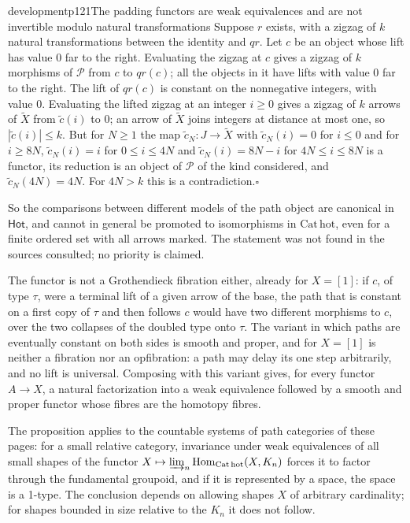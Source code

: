 \begin{dcomment}{development}{p121}{The padding functors are weak equivalences and are not invertible modulo natural transformations}
Suppose $r$ exists, with a zigzag of $k$ natural transformations between the identity and $qr$. Let $c$ be an object whose lift has value $0$ far to the right. Evaluating the zigzag at $c$ gives a zigzag of $k$ morphisms of $\mathcal P$ from $c$ to $qr(c)$; all the objects in it have lifts with value $0$ far to the right. The lift of $qr(c)$ is constant on the nonnegative integers, with value $0$. Evaluating the lifted zigzag at an integer $i\geq0$ gives a zigzag of $k$ arrows of $\widetilde X$ from $\widetilde c(i)$ to $0$; an arrow of $\widetilde X$ joins integers at distance at most one, so $|\widetilde c(i)|\leq k$. But for $N\geq1$ the map $\widetilde c_N:J\to\widetilde X$ with $\widetilde c_N(i)=0$ for $i\leq0$ and for $i\geq8N$, $\widetilde c_N(i)=i$ for $0\leq i\leq4N$ and $\widetilde c_N(i)=8N-i$ for $4N\leq i\leq8N$ is a functor, its reduction is an object of $\mathcal P$ of the kind considered, and $\widetilde c_N(4N)=4N$. For $4N>k$ this is a contradiction.\hfill$\square$

So the comparisons between different models of the path object are canonical in $\mathsf{Hot}$, and cannot in general be promoted to isomorphisms in $\mathrm{Cat}\,\mathrm{hot}$, even for a finite ordered set with all arrows marked. The statement was not found in the sources consulted; no priority is claimed.
\end{dcomment}

The functor is not a Grothendieck fibration either, already for $X=[1]$: if $c$, of type $\tau$, were a terminal lift of a given arrow of the base, the path that is constant on a first copy of $\tau$ and then follows $c$ would have two different morphisms to $c$, over the two collapses of the doubled type onto $\tau$. The variant in which paths are eventually constant on both sides is smooth and proper, and for $X=[1]$ is neither a fibration nor an opfibration: a path may delay its one step arbitrarily, and no lift is universal. Composing with this variant gives, for every functor $A\to X$, a natural factorization into a weak equivalence followed by a smooth and proper functor whose fibres are the homotopy fibres.

The proposition applies to the countable systems of path categories of these pages: for a small relative category, invariance under weak equivalences of all small shapes of the functor $X\mapsto\varinjlim_n\operatorname{Hom}_{\mathrm{Cat}\,\mathrm{hot}}(X,K_n)$ forces it to factor through the fundamental groupoid, and if it is represented by a space, the space is a 1-type. The conclusion depends on allowing shapes $X$ of arbitrary cardinality; for shapes bounded in size relative to the $K_n$ it does not follow.

